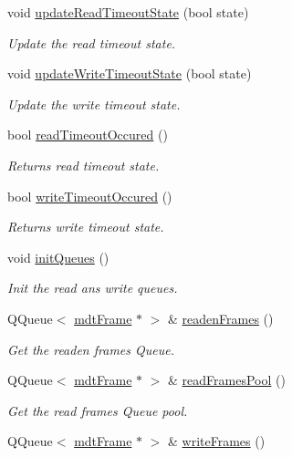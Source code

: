 \begin{DoxyCompactItemize}
void \hyperlink{classmdt_abstract_port_a0fc7317e988d5dea53a999cd1bf4faa9}{updateReadTimeoutState} (bool state)
\begin{DoxyCompactList}\small\item\em Update the read timeout state. \end{DoxyCompactList}\item 
void \hyperlink{classmdt_abstract_port_ab51135de1f7bbc4707c3284f924c98dc}{updateWriteTimeoutState} (bool state)
\begin{DoxyCompactList}\small\item\em Update the write timeout state. \end{DoxyCompactList}\item 
bool \hyperlink{classmdt_abstract_port_aec94143165e486cbbe6e0979be887c7e}{readTimeoutOccured} ()
\begin{DoxyCompactList}\small\item\em Returns read timeout state. \end{DoxyCompactList}\item 
bool \hyperlink{classmdt_abstract_port_a7c05a1abe77f0c3c334016c6ad866f67}{writeTimeoutOccured} ()
\begin{DoxyCompactList}\small\item\em Returns write timeout state. \end{DoxyCompactList}\item 
void \hyperlink{classmdt_abstract_port_adf06d095d6c3e6ce939a3998bcf8b829}{initQueues} ()
\begin{DoxyCompactList}\small\item\em Init the read ans write queues. \end{DoxyCompactList}\item 
QQueue$<$ \hyperlink{classmdt_frame}{mdtFrame} $\ast$ $>$ \& \hyperlink{classmdt_abstract_port_a05356a33dc546a11d2794a0419d749e0}{readenFrames} ()
\begin{DoxyCompactList}\small\item\em Get the readen frames Queue. \end{DoxyCompactList}\item 
QQueue$<$ \hyperlink{classmdt_frame}{mdtFrame} $\ast$ $>$ \& \hyperlink{classmdt_abstract_port_a3850ab819a8fc5dad22af14b74c45274}{readFramesPool} ()
\begin{DoxyCompactList}\small\item\em Get the read frames Queue pool. \end{DoxyCompactList}\item 
QQueue$<$ \hyperlink{classmdt_frame}{mdtFrame} $\ast$ $>$ \& \hyperlink{classmdt_abstract_port_a4fed10be147dfce6ca315467ff3fb968}{writeFrames} ()

\end{DoxyCompactItemize}
